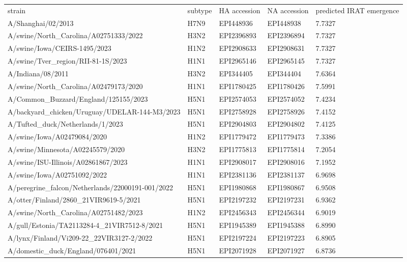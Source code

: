 \begin{tabular}{L{1.95in}|L{.25in}|L{.60in}|L{.6in}|C{1in}}\hline
strain&subtype& HA  accession & NA  accession & predicted  IRAT  emergence \\
A/Shanghai/02/2013&H7N9&EPI448936&EPI448938&7.7327\\
A/swine/North\_Carolina/A02751333/2022&H3N2&EPI2396893&EPI2396894&7.7327\\
A/swine/Iowa/CEIRS-1495/2023&H1N2&EPI2908633&EPI2908631&7.7327\\
A/swine/Tver\_region/RII-81-1S/2023&H1N1&EPI2965146&EPI2965145&7.7327\\
A/Indiana/08/2011&H3N2&EPI344405&EPI344404&7.6364\\
A/swine/North\_Carolina/A02479173/2020&H1N1&EPI1780425&EPI1780426&7.5991\\
A/Common\_Buzzard/England/125155/2023&H5N1&EPI2574053&EPI2574052&7.4234\\
A/backyard\_chicken/Uruguay/UDELAR-144-M3/2023&H5N1&EPI2758928&EPI2758926&7.4152\\
A/Tufted\_duck/Netherlands/1/2023&H5N1&EPI2904803&EPI2904802&7.4125\\
A/swine/Iowa/A02479084/2020&H1N2&EPI1779472&EPI1779473&7.3386\\
A/swine/Minnesota/A02245579/2020&H3N2&EPI1775813&EPI1775814&7.2054\\
A/swine/ISU-Illinois/A02861867/2023&H1N1&EPI2908017&EPI2908016&7.1952\\
A/swine/Iowa/A02751092/2022&H1N1&EPI2381136&EPI2381137&6.9698\\
A/peregrine\_falcon/Netherlands/22000191-001/2022&H5N1&EPI1980868&EPI1980867&6.9508\\
A/otter/Finland/2860\_21VIR9619-5/2021&H5N1&EPI2197232&EPI2197231&6.9362\\
A/swine/North\_Carolina/A02751482/2023&H1N2&EPI2456343&EPI2456344&6.9019\\
A/gull/Estonia/TA2113284-4\_21VIR7512-8/2021&H5N1&EPI1945389&EPI1945388&6.8990\\
A/lynx/Finland/Vi209-22\_22VIR3127-2/2022&H5N1&EPI2197224&EPI2197223&6.8905\\
A/domestic\_duck/England/076401/2021&H5N1&EPI2071928&EPI2071927&6.8736\\

\end{tabular}
